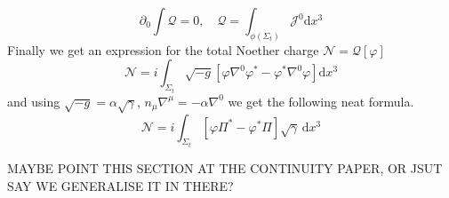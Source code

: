 \documentclass[11pt, oneside]{report}  %
\newcommand{\vp}{\varphi}
\newcommand{\dd}{\mathrm{d}}
\numberwithin{equation}{section}
\begin{document}
\begin{equation} \partial_0 \int \mathcal{Q}=0, \quad \mathcal{Q} = \int_{\phi(\Sigma_t)}\mathcal{J}^0 \dd x^3 \end{equation}
Finally we get an expression for the total Noether charge $\mathcal{N} = \mathcal{Q}[\vp]$
\begin{equation}\mathcal{N} =i \int_{\Sigma_t} \sqrt{-g}\left[ \vp \nabla^0 \vp^* - \vp^*\nabla^0 \vp\right] \dd x^3\end{equation}
and using $\sqrt{-g} = \alpha \sqrt{\gamma}$, $n_\mu \nabla^\mu = -\alpha \nabla^0$ we get the following neat formula.
\begin{equation} \mathcal{N} = i\int_{\Sigma_t}\left[ \vp \Pi^*-\vp^*\Pi\right] \sqrt{\gamma}\,\dd x^3\end{equation}

MAYBE POINT THIS SECTION AT THE CONTINUITY PAPER, OR JSUT SAY WE GENERALISE IT IN THERE?
\end{document}
